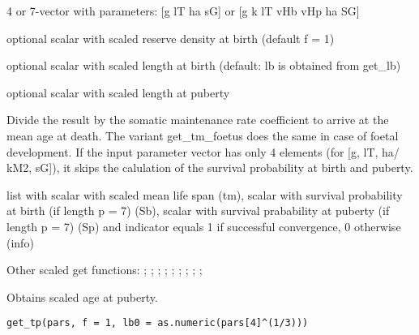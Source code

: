 \documentclass[a4paper]{book}
\begin{document}
%
\begin{Arguments}
\begin{ldescription}
\item[\code{pars}] 4 or 7-vector with parameters: [g lT ha sG] or [g k lT vHb vHp ha SG]

\item[\code{f}] optional scalar with scaled reserve density at birth (default f = 1)

\item[\code{lb}] optional scalar with scaled length at birth (default: lb is obtained from get\_lb)

\item[\code{lp}] optional scalar with scaled length at puberty
\end{ldescription}
\end{Arguments}
%
\begin{Details}\relax
Divide the result by the somatic maintenance rate coefficient to arrive at the mean age at death.
The variant get\_tm\_foetus does the same in case of foetal development.
If the input parameter vector has only 4 elements (for [g, lT, ha/ kM2, sG]),
it skips the calulation of the survival probability at birth and puberty.
\end{Details}
%
\begin{Value}
list with  scalar with scaled mean life span (tm),
scalar with survival probability at birth (if length p = 7) (Sb),
scalar with survival prabability at puberty (if length p = 7) (Sp)
and indicator equals 1 if successful convergence, 0 otherwise (info)
\end{Value}
%
\begin{SeeAlso}\relax
Other scaled get functions: ;
; ;
; ;
; ;
;
;
\end{SeeAlso}
%
\begin{Description}\relax
Obtains scaled age at puberty.
\end{Description}
%
\begin{Usage}
\begin{verbatim}
get_tp(pars, f = 1, lb0 = as.numeric(pars[4]^(1/3)))
\end{verbatim}
\end{Usage}
\end{document}
